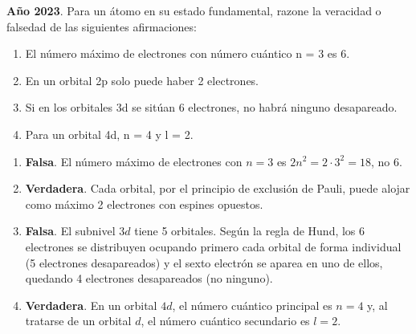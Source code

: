 \begin{exerciseEVAU}
    \textbf{Año 2023}.
    Para un átomo en su estado fundamental, razone la veracidad o falsedad de las siguientes
    afirmaciones:
    \begin{enumerate}[label=\letraminuscula]
\item El número máximo de electrones con número cuántico n = 3 es 6.
\item En un orbital 2p solo puede haber 2 electrones.
\item Si en los orbitales 3d se sitúan 6 electrones, no habrá ninguno desapareado.
\item Para un orbital 4d, n = 4 y l = 2.
    \end{enumerate}
    \begin{solu}
        \begin{enumerate}[label=\letraminuscula]
            \item \textbf{Falsa}. El número máximo de electrones con \(n=3\) es \(2n^2 = 2\cdot 3^2 = 18\), no 6.
            \item \textbf{Verdadera}. Cada orbital, por el principio de exclusión de Pauli, puede alojar como máximo 2 electrones con espines opuestos.
            \item \textbf{Falsa}. El subnivel \(3d\) tiene 5 orbitales. Según la regla de Hund, los 6 electrones se distribuyen ocupando primero cada orbital de forma individual (5 electrones desapareados) y el sexto electrón se aparea en uno de ellos, quedando 4 electrones desapareados (no ninguno).
            \item \textbf{Verdadera}. En un orbital \(4d\), el número cuántico principal es \(n=4\) y, al tratarse de un orbital \(d\), el número cuántico secundario es \(l=2\).
        \end{enumerate}
    \end{solu}
\end{exerciseEVAU}

